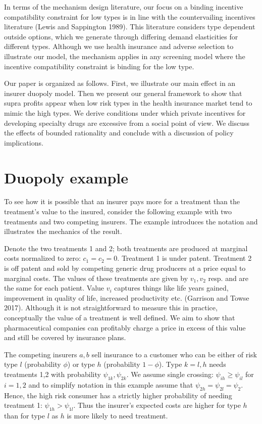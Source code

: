 \documentclass[a4paper,12pt]{article}
\makeatletter
\newcommand{\citeprocitem}[2]{\hyper@linkstart{cite}{citeproc_bib_item_#1}#2\hyper@linkend}
\makeatother
\begin{document}
In terms of the mechanism design literature, our focus on a binding incentive compatibility constraint for low types is in line with the countervailing incentives literature (\citeprocitem{28}{Lewis and Sappington 1989}). This literature considers type dependent outside options, which we generate through differing demand elasticities for different types. Although we use health insurance and adverse selection to illustrate our model, the mechanism applies in any screening model where the incentive compatibility constraint is binding for the low type.

Our paper is organized as follows. First, we illustrate our main effect in an insurer duopoly model. Then we present our general framework to show that supra profits appear when low risk types in the health insurance market tend to mimic the high types. We derive conditions under which private incentives for developing specialty drugs are excessive from a social point of view. We discuss the effects of bounded rationality and conclude with a discussion of policy implications.

\section{Duopoly example}
\label{sec:example}
\label{sec:example}

To see how it is possible that an insurer pays more for a treatment than the treatment's value to the insured, consider the following example with two treatments and two competing insurers. The example introduces the notation and illustrates the mechanics of the result.

Denote the two treatments 1 and 2; both treatments are produced at marginal costs normalized to zero: \(c_1 = c_2 =0\). Treatment 1 is under patent. Treatment 2 is off patent and sold by competing generic drug producers at a price equal to marginal costs. The values of these treatments are given by \(v_1,v_2\) resp. and are the same for each patient. Value \(v_i\) captures things like life years gained, improvement in quality of life, increased productivity etc. (\citeprocitem{16}{Garrison and Towse 2017}). Although it is not straightforward to measure this in practice, conceptually the value of a treatment is well defined. We aim to show that pharmaceutical companies can profitably charge a price in excess of this value and still be covered by insurance plans.

The competing insurers \(a,b\) sell insurance to a customer who can be either of risk type \(l\) (probability \(\phi\)) or type \(h\) (probability \(1-\phi\)). Type \(k=l,h\) needs treatments 1,2 with probability \(\psi_{1k},\psi_{2k}\). We assume single crossing: \(\psi_{ih} \geq \psi_{il}\) for \(i=1,2\) and to simplify notation in this example assume that \(\psi_{2h} = \psi_{2l} = \psi_2\). Hence, the high risk consumer has a strictly higher probability of needing treatment 1: \(\psi_{1h}>\psi_{1l}\). Thus the insurer's expected costs are higher for type \(h\) than for type \(l\) as \(h\) is more likely to need treatment.
\end{document}
